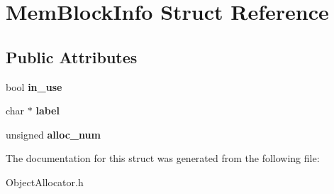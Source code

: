 \hypertarget{structMemBlockInfo}{\section{Mem\-Block\-Info Struct Reference}
\label{structMemBlockInfo}
}
\subsection*{Public Attributes}
\begin{DoxyCompactItemize}
\item 
\hypertarget{structMemBlockInfo_a6a2898598d9e106c34df94961bb08fc8}{bool {\bfseries in\-\_\-use}}\label{structMemBlockInfo_a6a2898598d9e106c34df94961bb08fc8}

\item 
\hypertarget{structMemBlockInfo_ac92dcd55e4d9f19752f883174354f7d4}{char $\ast$ {\bfseries label}}\label{structMemBlockInfo_ac92dcd55e4d9f19752f883174354f7d4}

\item 
\hypertarget{structMemBlockInfo_abf028a52d7595ad36098b3cc8da0c687}{unsigned {\bfseries alloc\-\_\-num}}\label{structMemBlockInfo_abf028a52d7595ad36098b3cc8da0c687}

\end{DoxyCompactItemize}


The documentation for this struct was generated from the following file\-:\begin{DoxyCompactItemize}
\item 
Object\-Allocator.\-h\end{DoxyCompactItemize}

